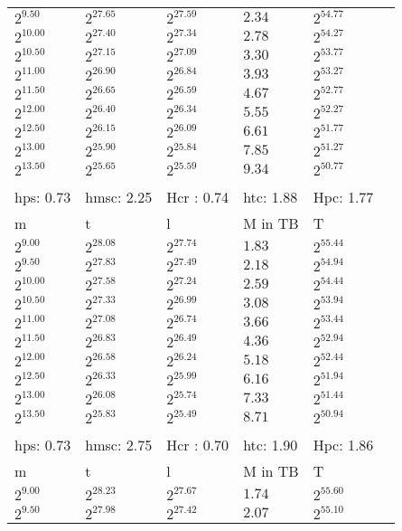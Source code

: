 \begin{tabular}{llllll}
$2^{9.50}$ & $2^{27.65}$ & $2^{27.59}$ & $2.34$ & $2^{54.77}$ \\
$2^{10.00}$ & $2^{27.40}$ & $2^{27.34}$ & $2.78$ & $2^{54.27}$ \\
$2^{10.50}$ & $2^{27.15}$ & $2^{27.09}$ & $3.30$ & $2^{53.77}$ \\
$2^{11.00}$ & $2^{26.90}$ & $2^{26.84}$ & $3.93$ & $2^{53.27}$ \\
$2^{11.50}$ & $2^{26.65}$ & $2^{26.59}$ & $4.67$ & $2^{52.77}$ \\
$2^{12.00}$ & $2^{26.40}$ & $2^{26.34}$ & $5.55$ & $2^{52.27}$ \\
$2^{12.50}$ & $2^{26.15}$ & $2^{26.09}$ & $6.61$ & $2^{51.77}$ \\
$2^{13.00}$ & $2^{25.90}$ & $2^{25.84}$ & $7.85$ & $2^{51.27}$ \\
$2^{13.50}$ & $2^{25.65}$ & $2^{25.59}$ & $9.34$ & $2^{50.77}$ \\
 &  &  &  &  &  \\
hps: 0.73 & hmsc: 2.25 & Hcr : 0.74 & htc: 1.88 & Hpc: 1.77 &  \\
m & t & l & M in TB & T \\
$2^{9.00}$ & $2^{28.08}$ & $2^{27.74}$ & $1.83$ & $2^{55.44}$ \\
$2^{9.50}$ & $2^{27.83}$ & $2^{27.49}$ & $2.18$ & $2^{54.94}$ \\
$2^{10.00}$ & $2^{27.58}$ & $2^{27.24}$ & $2.59$ & $2^{54.44}$ \\
$2^{10.50}$ & $2^{27.33}$ & $2^{26.99}$ & $3.08$ & $2^{53.94}$ \\
$2^{11.00}$ & $2^{27.08}$ & $2^{26.74}$ & $3.66$ & $2^{53.44}$ \\
$2^{11.50}$ & $2^{26.83}$ & $2^{26.49}$ & $4.36$ & $2^{52.94}$ \\
$2^{12.00}$ & $2^{26.58}$ & $2^{26.24}$ & $5.18$ & $2^{52.44}$ \\
$2^{12.50}$ & $2^{26.33}$ & $2^{25.99}$ & $6.16$ & $2^{51.94}$ \\
$2^{13.00}$ & $2^{26.08}$ & $2^{25.74}$ & $7.33$ & $2^{51.44}$ \\
$2^{13.50}$ & $2^{25.83}$ & $2^{25.49}$ & $8.71$ & $2^{50.94}$ \\
 &  &  &  &  &  \\
hps: 0.73 & hmsc: 2.75 & Hcr : 0.70 & htc: 1.90 & Hpc: 1.86 &  \\
m & t & l & M in TB & T \\
$2^{9.00}$ & $2^{28.23}$ & $2^{27.67}$ & $1.74$ & $2^{55.60}$ \\
$2^{9.50}$ & $2^{27.98}$ & $2^{27.42}$ & $2.07$ & $2^{55.10}$ \\

\end{tabular}
